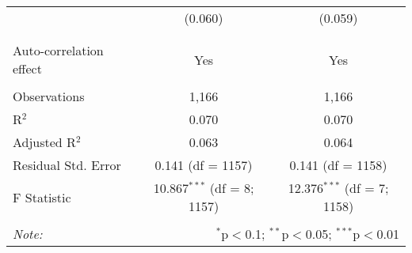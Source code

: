 \begin{table}[!htbp]
\begin{tabular}{@{\extracolsep{5pt}}lcc}
  & (0.060) & (0.059) \\ 
  & & \\ 
\hline \\[-1.8ex] 
Auto-correlation effect & Yes & Yes \\ 
\hline \\[-1.8ex] 
Observations & 1,166 & 1,166 \\ 
R$^{2}$ & 0.070 & 0.070 \\ 
Adjusted R$^{2}$ & 0.063 & 0.064 \\ 
Residual Std. Error & 0.141 (df = 1157) & 0.141 (df = 1158) \\ 
F Statistic & 10.867$^{***}$ (df = 8; 1157) & 12.376$^{***}$ (df = 7; 1158) \\ 
\hline 
\hline \\[-1.8ex] 
\textit{Note:}  & \multicolumn{2}{r}{$^{*}$p$<$0.1; $^{**}$p$<$0.05; $^{***}$p$<$0.01} \\ 
\end{tabular} 
\end{table} 
